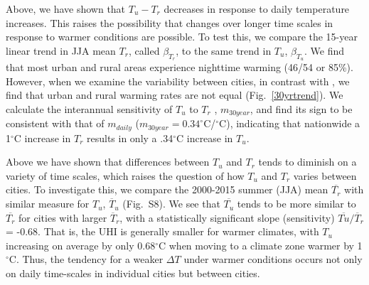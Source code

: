 \documentclass[12pt]{iopart}
\begin{document}
{%

Above, we have shown that $T_u - T_r$ decreases in response to daily temperature increases. This raises the possibility that  changes over longer time scales in response to warmer conditions are possible. To test this, we compare the 15-year linear trend in JJA mean $T_r$, called $\beta_{T_r}$, to the same trend in $T_u$, $\beta_{T_u}$. We find that most urban and rural areas experience nighttime warming (46/54 or 85\%). However, when we examine the variability between cities, in contrast with , %
we find that urban and rural warming rates are not equal (Fig.~\ref{30yrtrend}). 
We calculate the interannual sensitivity of $T_u$ to $T_r$ , $m_{30 year}$, and find its sign to be consistent with that of $m_{daily}$ ($m_{30 year} = 0.34 ^\circ$C/$^\circ $C), indicating that nationwide a 1$^\circ $C increase in $T_r$ results in only a .34$^\circ $C increase in $T_u$.

Above we have shown that differences between $T_u$ and $T_r$ tends to diminish %
on a variety of time scales, which raises the question of how $T_u$ and $T_r$ varies between cities.
 To investigate this, we compare the 2000-2015 summer (JJA) mean $\overline{T_r}$ with similar measure for $T_u$, $\overline{T}_{u}$ (Fig.~S8).  %
We see that $\overline{T_u}$ tends to be more similar to $\overline{T_r}$ for cities with larger $\overline{T}_{r}$, with a statistically significant slope (sensitivity) $\overline{ Tu}/\overline{T}_{r}$ = -0.68. That is, the UHI is generally smaller for warmer climates, with $T_u$ increasing on average by only 0.68$^\circ $C when moving to a climate zone warmer by 1$^\circ$C. Thus, the tendency for a weaker $\Delta T$ under warmer conditions occurs not only on daily time-scales in individual cities but between cities. 

}
\end{document}
